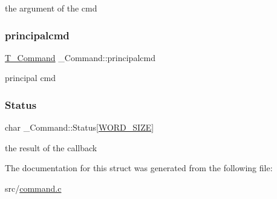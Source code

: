 the argument of the cmd \mbox{\label{struct__Command_a099eea30318b79292723aaf348393eb3}} 
\subsubsection{\texorpdfstring{principalcmd}{principalcmd}}
{\footnotesize\ttfamily \hyperlink{command_8h_a0473597db8c45c0289b6b8e2f8abbe32}{T\+\_\+\+Command} \+\_\+\+Command\+::principalcmd}

principal cmd \mbox{\label{struct__Command_aed496fc04257ae186688187815e0390c}} 
\subsubsection{\texorpdfstring{Status}{Status}}
{\footnotesize\ttfamily char \+\_\+\+Command\+::\+Status\mbox{[}\hyperlink{types_8h_a92ed8507d1cd2331ad09275c5c4c1c89}{W\+O\+R\+D\+\_\+\+S\+I\+ZE}\mbox{]}}

the result of the callback 

The documentation for this struct was generated from the following file\+:\begin{DoxyCompactItemize}
\item 
src/\hyperlink{command_8c}{command.\+c}\end{DoxyCompactItemize}
